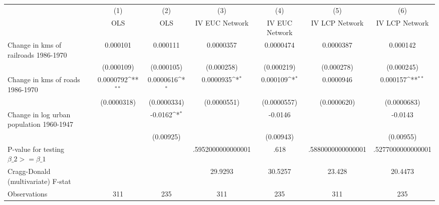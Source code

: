 {
\def\sym#1{\ifmmode^{#1}\else\(^{#1}\)\fi}
\begin{tabular}{l*{6}{c}}
\hline\hline
                &\multicolumn{1}{c}{(1)}&\multicolumn{1}{c}{(2)}&\multicolumn{1}{c}{(3)}&\multicolumn{1}{c}{(4)}&\multicolumn{1}{c}{(5)}&\multicolumn{1}{c}{(6)}\\
                &\multicolumn{1}{c}{OLS}&\multicolumn{1}{c}{OLS}&\multicolumn{1}{c}{IV EUC Network}&\multicolumn{1}{c}{IV EUC Network}&\multicolumn{1}{c}{IV LCP Network}&\multicolumn{1}{c}{IV LCP Network}\\
\hline
Change in kms of railroads 1986-1970& 0.000101         & 0.000111         &0.0000357         &0.0000474         &0.0000387         & 0.000142         \\
                &(0.000109)         &(0.000105)         &(0.000258)         &(0.000219)         &(0.000278)         &(0.000245)         \\
[1em]
Change in kms of roads 1986-1970&0.0000792\sym{**} &0.0000616\sym{*}  &0.0000935\sym{*}  & 0.000109\sym{*}  &0.0000946         & 0.000157\sym{**} \\
                &(0.0000318)         &(0.0000334)         &(0.0000551)         &(0.0000557)         &(0.0000620)         &(0.0000683)         \\
[1em]
Change in log urban population 1960-1947&                  &  -0.0162\sym{*}  &                  &  -0.0146         &                  &  -0.0143         \\
                &                  &(0.00925)         &                  &(0.00943)         &                  &(0.00955)         \\
\hline
P-value for testing $\beta\_{2} >= \beta\_{1}$&                  &                  &.5952000000000001         &     .618         &.5880000000000001         &.5277000000000001         \\
Cragg-Donald (multivariate) F-stat&                  &                  &  29.9293         &  30.5257         &   23.428         &  20.4473         \\
Observations    &      311         &      235         &      311         &      235         &      311         &      235         \\
\hline\hline
\end{tabular}
}
